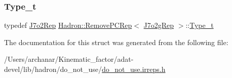 \mbox{\label{structHadron_1_1RemovePCRep_3_01J7o2gRep_01_4_a588ca5a96069442fc4282729bdc40e7f}} 
\subsubsection{\texorpdfstring{Type\_t}{Type\_t}\hspace{0.1cm}{\footnotesize\ttfamily [2/2]}}
{\footnotesize\ttfamily typedef \mbox{\hyperlink{structHadron_1_1J7o2Rep}{J7o2\+Rep}} \mbox{\hyperlink{structHadron_1_1RemovePCRep}{Hadron\+::\+Remove\+P\+C\+Rep}}$<$ \mbox{\hyperlink{structHadron_1_1J7o2gRep}{J7o2g\+Rep}} $>$\+::\mbox{\hyperlink{structHadron_1_1RemovePCRep_3_01J7o2gRep_01_4_a588ca5a96069442fc4282729bdc40e7f}{Type\+\_\+t}}}



The documentation for this struct was generated from the following file\+:\begin{DoxyCompactItemize}
\item 
/\+Users/archanar/\+Kinematic\+\_\+factor/adat-\/devel/lib/hadron/do\+\_\+not\+\_\+use/\mbox{\hyperlink{adat-devel_2lib_2hadron_2do__not__use_2do__not__use_8irreps_8h}{do\+\_\+not\+\_\+use.\+irreps.\+h}}\end{DoxyCompactItemize}
